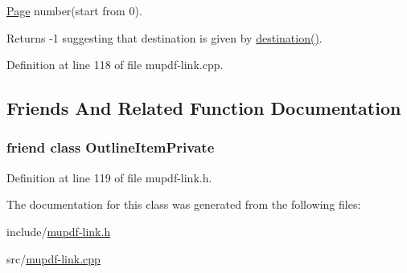 \hyperlink{class_mu_p_d_f_1_1_page}{Page} number(start from 0). 

\begin{DoxyReturn}{Returns}
-\/1 suggesting that destination is given by \hyperlink{class_mu_p_d_f_1_1_link_goto_r_ab5ff953c35930b5ff57740decee8c61b}{destination()}. 
\end{DoxyReturn}


Definition at line 118 of file mupdf-\/link.\-cpp.



\subsection{Friends And Related Function Documentation}
\hypertarget{class_mu_p_d_f_1_1_link_goto_r_ab008ed670017e41b6e6bba8707c775d2}{
\subsubsection[{Outline\-Item\-Private}]{\setlength{\rightskip}{0pt plus 5cm}friend class Outline\-Item\-Private\hspace{0.3cm}{\ttfamily [friend]}}}\label{class_mu_p_d_f_1_1_link_goto_r_ab008ed670017e41b6e6bba8707c775d2}


Definition at line 119 of file mupdf-\/link.\-h.



The documentation for this class was generated from the following files\-:\begin{DoxyCompactItemize}
\item 
include/\hyperlink{mupdf-link_8h}{mupdf-\/link.\-h}\item 
src/\hyperlink{mupdf-link_8cpp}{mupdf-\/link.\-cpp}\end{DoxyCompactItemize}
